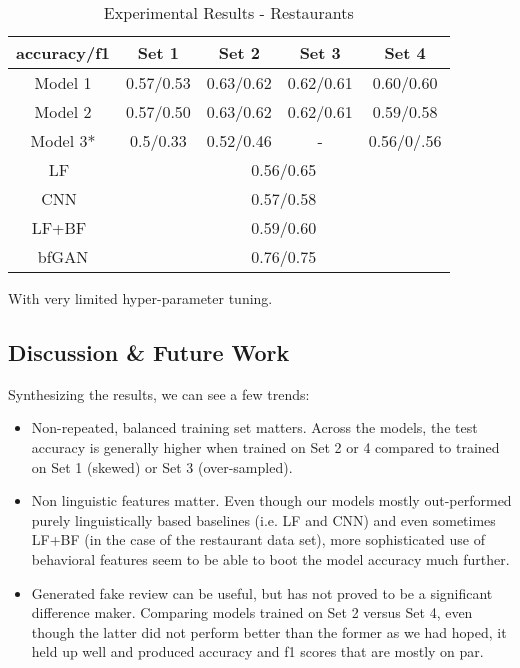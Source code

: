\documentclass[conference, 11pt]{IEEEtran} %
\theoremstyle{plain}
\theoremstyle{definition}
\begin{document}
\begin{table}[H]
\small
\caption{Experimental Results - Restaurants}
\centering
\begin{tabular}{|c|c|c|c|c|}
\hline
 accuracy/f1 & Set 1 & Set 2 & Set 3 & Set 4 \\ \hline
Model 1 & 0.57/0.53 & 0.63/0.62 & 0.62/0.61 & 0.60/0.60 \\ \hline
Model 2 & 0.57/0.50 & 0.63/0.62 & 0.62/0.61 & 0.59/0.58 \\ \hline
Model 3* & 0.5/0.33 & 0.52/0.46 & - & 0.56/0/.56 \\ \hline
LF~\cite{Tang2020} & \multicolumn{4}{c|}{0.56/0.65} \\ \hline
CNN~\cite{Tang2020} & \multicolumn{4}{c|}{0.57/0.58} \\ \hline
LF+BF~\cite{Tang2020} & \multicolumn{4}{c|}{0.59/0.60} \\ \hline
bfGAN\cite{Tang2020}& \multicolumn{4}{c|}{0.76/0.75} \\
\hline
\end{tabular}
\label{exp-restaurants}
\end{table}

\vspace{-1.5em}

{\footnotesize * With very limited hyper-parameter tuning.}


\subsection{Discussion \& Future Work}
Synthesizing the results, we can see a few trends:
\begin{itemize}
\item Non-repeated, balanced training set matters. Across the models, the test accuracy is generally higher when trained on Set 2 or 4 compared to trained on Set 1 (skewed) or Set 3 (over-sampled).
\item Non linguistic features matter. Even though our models mostly out-performed purely linguistically based baselines (i.e. LF and CNN) and even sometimes LF+BF (in the case of the restaurant data set), more sophisticated use of behavioral features seem to be able to boot the model accuracy much further.
\item Generated fake review can be useful, but has not proved to be a significant difference maker. Comparing models trained on Set 2 versus Set 4, even though the latter did not perform better than the former as we had hoped, it held up well and produced accuracy and f1 scores that are mostly on par.
\end{itemize}
\end{document}
